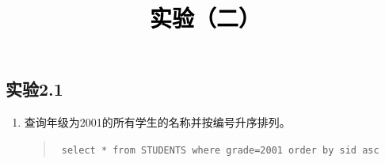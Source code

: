 \documentclass[a4paper,twoside]{article}
\newcommand{\PaperTitle}{实验（二）}  %
\begin{document}
\newpage

\title{
	\Large{\textcolor{black}{\PaperTitle}}
}
	
	
\maketitle
	
\tableofcontents
 
\newpage
\setcounter{page}{1}

\begin{spacing}{1.2}

\section{实验2.1}

\begin{enumerate}
\item 查询年级为2001的所有学生的名称并按编号升序排列。
\begin{quote}
\texttt{
select * from STUDENTS where grade=2001 order by sid asc
}
\end{quote}


\end{enumerate}
\end{spacing}
\end{document}

